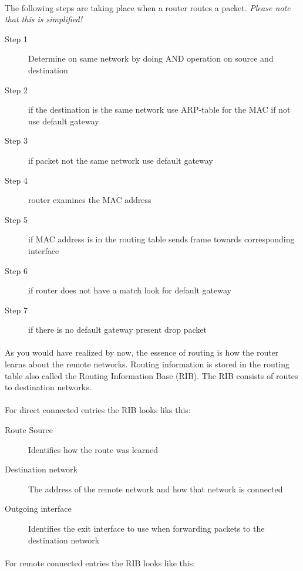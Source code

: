 \documentclass[10pt,landscape]{article}
\begin{document}
\begin{multicols}{3}
\paragraph{}The following steps are taking place when a router routes a packet. \textit{Please note that this is simplified!}
\begin{description}
	\item[Step 1] Determine on same network by doing AND operation on source and destination
	\item[Step 2] if the destination is the same network use ARP-table for the MAC if not use default gateway
	\item[Step 3] if packet not the same network use default gateway
	\item[Step 4] router examines the MAC address
	\item[Step 5] if MAC address is in the routing table sends frame towards corresponding interface
	\item[Step 6] if router does not have a match look for default gateway
	\item[Step 7] if there is no default gateway present drop packet
\end{description}
\paragraph{}As you would have realized by now, the essence of routing is how the router learns about the remote networks. Routing information is stored in the routing table also called the Routing Information Base (RIB). The RIB consists of routes to destination networks.
\paragraph{}For direct connected entries the RIB looks liks this:
 \begin{description}
	\item[Route Source] Identifies how the route was learned
	\item[Destination network]The address of the remote network and how that network is connected
	\item[Outgoing interface]  Identifies the exit interface to use when forwarding packets to the destination network
\end{description}
\paragraph{}
For remote connected entries the RIB looks like this:

\end{multicols}
\end{document}
